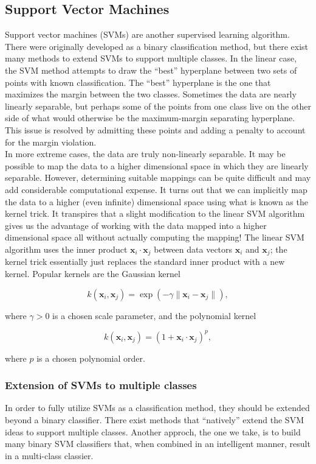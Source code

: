 \documentclass[12pt]{article}
\begin{document}
\subsection{Support Vector Machines}
Support vector machines (SVMs) are another supervised learning algorithm.  There were originally developed as a binary classification method, but there exist many methods to extend SVMs to support multiple classes.  In the linear case, the SVM method attempts to draw the ``best'' hyperplane between two sets of points with known classification.  The ``best'' hyperplane is the one that maximizes the margin between the two classes.  Sometimes the data are nearly linearly separable, but perhaps some of the points from one class live on the other side of what would otherwise be the maximum-margin separating hyperplane.  This issue is resolved by admitting these points and adding a penalty to account for the margin violation.\\

In more extreme cases, the data are truly non-linearly separable.  It may be possible to map the data to a higher dimensional space in which they are linearly separable.  However, determining suitable mappings can be quite difficult and may add considerable computational expense.  It turns out that we can implicitly map the data to a higher (even infinite) dimensional space using what is known as the kernel trick.  It transpires that a slight modification to the linear SVM algorithm gives us the advantage of working with the data mapped into a higher dimensional space all without actually computing the mapping!  The linear SVM algorithm uses the inner product $\mathbf{x}_i\cdot\mathbf{x}_j$ between data vectors $\mathbf{x}_i$ and $\mathbf{x}_j$; the kernel trick essentially just replaces the standard inner product with a new kernel.  Popular kernels are the Gaussian kernel

\[ k(\mathbf{x}_i,\mathbf{x}_j) = \exp\left(-\gamma \|\mathbf{x}_i-\mathbf{x}_j\|\right), \] 

\noindent where $\gamma>0$ is a chosen scale parameter, and the polynomial kernel

\[ k(\mathbf{x}_i,\mathbf{x}_j) = \left(1+\mathbf{x}_i\cdot\mathbf{x}_j\right)^p, \] 

\noindent where $p$ is a chosen polynomial order.\\

\subsubsection{Extension of SVMs to multiple classes}
In order to fully utilize SVMs as a classification method, they should be extended beyond a binary classifier.  There exist methods that ``natively'' extend the SVM ideas to support multiple classes.  Another approch, the one we take, is to build many binary SVM classifiers that, when combined in an intelligent manner, result in a multi-class classier.\\ 
\end{document}

